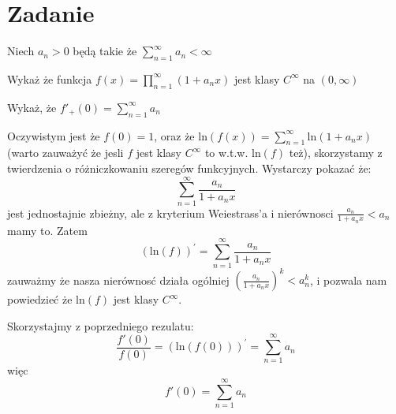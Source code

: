 \documentclass[11pt]{scrartcl}
\begin{document}
      \section{Zadanie}
          \begin{zadanie}
              Niech $a_n > 0$ będą takie że $\sum_{n=1}^{\infty } a_n < \infty  $
              \begin{walk}
              \item Wykaż że funkcja $f(x) = \prod_{n=1}^{\infty } (1 + a_n x) $ jest klasy $C^{\infty }$ na $(0, \infty )$
                \item Wykaż, że $f'_+(0) = \sum_{n=1}^{\infty } a_n $
              \end{walk}
                        \end{zadanie}
              \begin{walk}
              \item Oczywistym jest że $f(0) = 1$, oraz że $\text{ln} \left ( f(x) \right ) = \sum_{n=1}^{\infty } \text{ln} \left ( 1 + a_n x \right )  $ (warto zauważyć że jesli $f$ jest klasy $C^{\infty }$ to w.t.w. $\text{ln} \left ( f \right ) $ też), skorzystamy z twierdzenia o różniczkowaniu szeregów funkcyjnych.
                    Wystarczy pokazać że:
                    \[
                        \sum_{n=1}^{\infty } \frac{a_n}{1 + a_n x}  
                    \]
                    jest jednostajnie zbieżny, ale z kryterium Weiestrass'a i nierównosci $\frac{a_n}{1 + a_n x} < a_n$ mamy to.
                    Zatem
                    \[
                        \left ( \text{ln} \left ( f \right )  \right )^{'} = \sum_{n=1}^{\infty } \frac{a_n}{1 + a_n x}   
                    \]
                    zauważmy że nasza nierównosć działa ogólniej $\left ( \frac{a_n}{1 + a_n x} \right )^k < a_n^k$, i pozwala nam powiedzieć że $\text{ln} \left ( f \right ) $ jest klasy $C^{\infty }$.
                    
                \item Skorzystajmy z poprzedniego rezulatu:
                  \[
                      \frac{f'(0)}{f(0)} = \left ( \text{ln} \left ( f(0) \right )  \right )^{'} = \sum_{n=1}^{\infty } a_n  
                  \]
                  więc 
                  \[
                      f'(0) = \sum_{n=1}^{\infty } a_n  
                  \]
              \end{walk}
\end{document}
